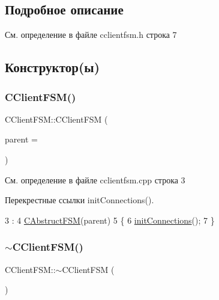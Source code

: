 \subsection{Подробное описание}


См. определение в файле cclientfsm.\+h строка 7



\subsection{Конструктор(ы)}
\hypertarget{class_c_client_f_s_m_ad5cde8ac83f83aa722a1739bdf46a453}{}\label{class_c_client_f_s_m_ad5cde8ac83f83aa722a1739bdf46a453} 
\subsubsection{\texorpdfstring{C\+Client\+F\+S\+M()}{CClientFSM()}}
{\footnotesize\ttfamily C\+Client\+F\+S\+M\+::\+C\+Client\+F\+SM (\begin{DoxyParamCaption}\item[{Q\+Object $\ast$}]{parent = {} }\end{DoxyParamCaption})\hspace{0.3cm}{\ttfamily [explicit]}}



См. определение в файле cclientfsm.\+cpp строка 3



Перекрестные ссылки init\+Connections().


\begin{DoxyCode}
3                                      :
4     \hyperlink{class_c_abstruct_f_s_m_a54037c986f6b437c50d5e8ba42063330}{CAbstructFSM}(parent)
5 \{
6     \hyperlink{class_c_client_f_s_m_aaf6b857e9a5d2b2f55b71212e74fd4cb}{initConnections}();
7 \}
\end{DoxyCode}
\hypertarget{class_c_client_f_s_m_acd28280c438e234e05340ddb46472c2d}{}\label{class_c_client_f_s_m_acd28280c438e234e05340ddb46472c2d} 
\subsubsection{\texorpdfstring{$\sim$\+C\+Client\+F\+S\+M()}{~CClientFSM()}}
{\footnotesize\ttfamily C\+Client\+F\+S\+M\+::$\sim$\+C\+Client\+F\+SM (\begin{DoxyParamCaption}{ }\end{DoxyParamCaption})\hspace{0.3cm}{\ttfamily [virtual]}}



